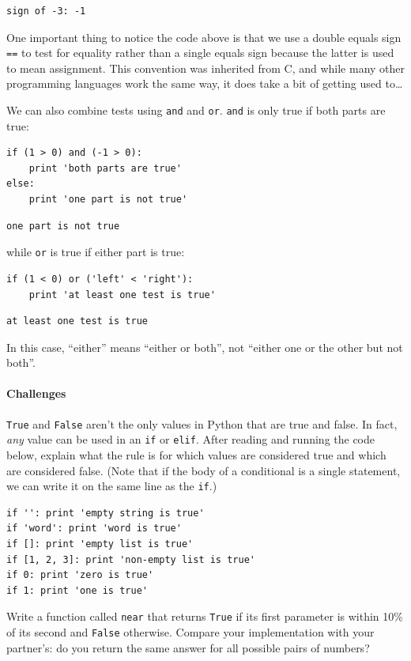 \documentclass{book}
\begin{document}
\begin{verbatim}
sign of -3: -1
\end{verbatim}

One important thing to notice the code above is that we use a double
equals sign \texttt{==} to test for equality rather than a single equals
sign because the latter is used to mean assignment. This convention was
inherited from C, and while many other programming languages work the
same way, it does take a bit of getting used to\ldots{}

We can also combine tests using \texttt{and} and \texttt{or}.
\texttt{and} is only true if both parts are true:

\begin{verbatim}
if (1 > 0) and (-1 > 0):
    print 'both parts are true'
else:
    print 'one part is not true'
\end{verbatim}

\begin{verbatim}
one part is not true
\end{verbatim}

while \texttt{or} is true if either part is true:

\begin{verbatim}
if (1 < 0) or ('left' < 'right'):
    print 'at least one test is true'
\end{verbatim}

\begin{verbatim}
at least one test is true
\end{verbatim}

In this case, ``either'' means ``either or both'', not ``either one or
the other but not both''.

\mbox{}\paragraph{Challenges}

\begin{swcenumerate}
\item
  \texttt{True} and \texttt{False} aren't the only values in Python that
  are true and false. In fact, \emph{any} value can be used in an
  \texttt{if} or \texttt{elif}. After reading and running the code
  below, explain what the rule is for which values are considered true
  and which are considered false. (Note that if the body of a
  conditional is a single statement, we can write it on the same line as
  the \texttt{if}.)

\begin{verbatim}
if '': print 'empty string is true'
if 'word': print 'word is true'
if []: print 'empty list is true'
if [1, 2, 3]: print 'non-empty list is true'
if 0: print 'zero is true'
if 1: print 'one is true'
\end{verbatim}
\item
  Write a function called \texttt{near} that returns \texttt{True} if
  its first parameter is within 10\% of its second and \texttt{False}
  otherwise. Compare your implementation with your partner's: do you
  return the same answer for all possible pairs of numbers?
\end{swcenumerate}
\end{document}
